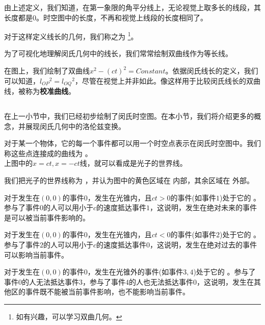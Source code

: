由上述定义，我们知道，在第一象限的角平分线上，无论视觉上取多长的线段，其长度都是$0$。时空图中的长度，不再和视觉上线段的长度相同了。

对于这样定义线长的几何，我们称之为 \footnote{如有兴趣，可以学习双曲几何。}。

为了可视化地理解闵氏几何中的线长，我们常常绘制双曲线作为等长线。

在图上，我们绘制了双曲线$x^2-(ct)^2=Constant$。依据闵氏线长的定义，我们可以知道，$l_{OP}{}^2=l_{OQ}{}^2$，尽管在视觉上并非如此。像这样用于比较闵氏线长的双曲线，被称为\textbf{校准曲线}。
\subsection[闵氏几何中的洛伦兹变换]{}
在上一小节中，我们已经初步绘制了闵氏时空图。在本小节，我们将介绍更多的概念，并展现闵氏几何中的洛伦兹变换。

\begin{Itemize}
    \item {} 对于某一个物体，它的每一个事件都可以用一个时空点表示在闵氏时空图中。我们称这些点连接成的曲线为 。\\
    \eg 上图中的$x=ct,x=-ct$线，就可以看成是光子的世界线。
    \item {} 我们把光子的世界线称为 ，并认为图中的黄色区域在  内部，其余区域在  外部。
    \item {} 对于发生在$(0,0)$的事件$0$，发生在光锥内，且$ct>0$的事件(如事件$1$)处于它的 。参与了事件$0$的人可以用小于$c$的速度抵达事件$1$，这说明，发生在绝对未来的事件是可以被当前事件影响的。
    \item {} 对于发生在$(0,0)$的事件$0$，发生在光锥内，且$ct<0$的事件(如事件$2$)处于它的 。参与了事件$2$的人可以用小于$c$的速度抵达事件$0$，这说明，发生在绝对过去的事件可以影响当前事件。
    \item {} 对于发生在$(0,0)$的事件$0$，发生在光锥外的事件(如事件$3,4$)处于它的 。参与了事件$0$的人无法抵达事件$3$，参与了事件$4$的人也无法抵达事件$0$，这说明，发生在其他区的事件既不能被当前事件影响，也不能影响当前事件。
\end{Itemize}

